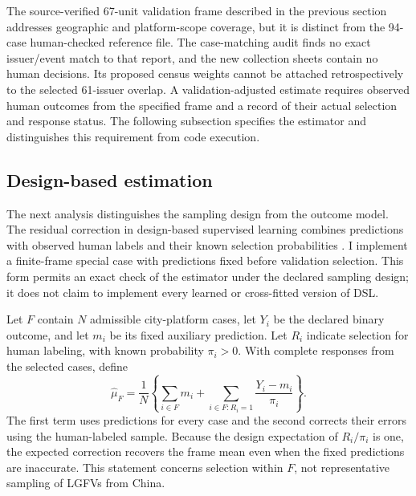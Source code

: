 The source-verified 67-unit validation frame described in the previous section
addresses geographic and platform-scope coverage, but it is distinct from the
94-case human-checked reference file. The case-matching audit finds no exact
issuer/event match to that report, and the new collection sheets contain no
human decisions. Its proposed census weights cannot be
attached retrospectively to the selected 61-issuer overlap. A validation-adjusted
estimate requires observed human outcomes from the specified frame and a
record of their actual selection and response status. The following subsection
specifies the estimator and distinguishes this requirement from code execution.

\subsection{Design-based estimation}

The next analysis distinguishes the sampling design from the outcome model.
The residual correction in design-based supervised learning combines predictions
with observed human labels and their known selection probabilities
\citep{egami2023dsl}. I implement a finite-frame special case with predictions
fixed before validation selection. This form permits an exact check of the
estimator under the declared sampling design; it does not claim to implement
every learned or cross-fitted version of DSL.

Let $F$ contain $N$ admissible city-platform cases, let $Y_i$ be the declared
binary outcome, and let $m_i$ be its fixed auxiliary prediction. Let $R_i$
indicate selection for human labeling, with known probability $\pi_i>0$.
With complete responses from the selected cases, define
\begin{equation}
\widehat\mu_F=\frac{1}{N}\left\{
\sum_{i\in F}m_i+
\sum_{i\in F:R_i=1}\frac{Y_i-m_i}{\pi_i}\right\}.
\label{eq:validation-mean}
\end{equation}
The first term uses predictions for every case and the second corrects their
errors using the human-labeled sample. Because the design expectation of
$R_i/\pi_i$ is one, the expected correction recovers the frame mean even when
the fixed predictions are inaccurate. This statement concerns selection within
$F$, not representative sampling of LGFVs from China.

